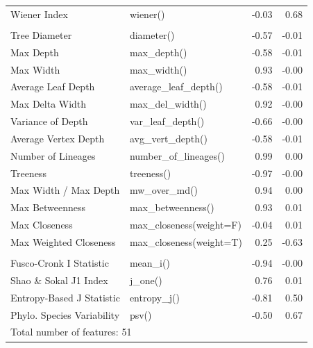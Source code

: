 \begin{table}
\begin{tabular}[t]{llrr}
\hspace{1em}Wiener Index & wiener() & -0.03 & 0.68\\
\addlinespace[0.3em]
\multicolumn{4}{l}{\textbf{Tree Shape, Size \& Centrality}}\\
\hspace{1em}Tree Diameter & diameter() & -0.57 & -0.01\\
\hspace{1em}Max Depth & max\_depth() & -0.58 & -0.01\\
\hspace{1em}Max Width & max\_width() & 0.93 & -0.00\\
\hspace{1em}Average Leaf Depth & average\_leaf\_depth() & -0.58 & -0.01\\
\hspace{1em}Max Delta Width & max\_del\_width() & 0.92 & -0.00\\
\hspace{1em}Variance of Depth & var\_leaf\_depth() & -0.66 & -0.00\\
\hspace{1em}Average Vertex Depth & avg\_vert\_depth() & -0.58 & -0.01\\
\hspace{1em}Number of Lineages & number\_of\_lineages() & 0.99 & 0.00\\
\hspace{1em}Treeness & treeness() & -0.97 & -0.00\\
\hspace{1em}Max Width / Max Depth & mw\_over\_md() & 0.94 & 0.00\\
\hspace{1em}Max Betweenness & max\_betweenness() & 0.93 & 0.01\\
\hspace{1em}Max Closeness & max\_closeness(weight=F) & -0.04 & 0.01\\
\hspace{1em}Max Weighted Closeness & max\_closeness(weight=T) & 0.25 & -0.63\\
\addlinespace[0.3em]
\multicolumn{4}{l}{\textbf{Diversification \& Information Content}}\\
\hspace{1em}Fusco-Cronk I Statistic & mean\_i() & -0.94 & -0.00\\
\hspace{1em}Shao \& Sokal J1 Index & j\_one() & 0.76 & 0.01\\
\hspace{1em}Entropy-Based J Statistic & entropy\_j() & -0.81 & 0.50\\
\hspace{1em}Phylo. Species Variability & psv() & -0.50 & 0.67\\
\bottomrule
\multicolumn{4}{l}{\rule{0pt}{1em}Total number of features: 51}\\
\end{tabular}
\end{table}
